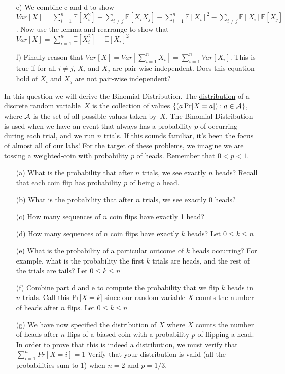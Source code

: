 \documentclass[]{article}
\def \exx {\mathbb{E}}
\begin{document}
\begin{qunlist}
\begin{enumerate}
\qpart
\item[e)] We combine c and d to show $Var[X] = \sum\nolimits_{i=1}^n \exx[X_i^2] + \sum\limits_{i \neq j} \exx[X_iX_j] -  \sum\nolimits_{i=1}^n \exx[X_i]^2 - \sum\limits_{i \neq j} \exx[X_i] \exx[X_j]$. Now use the lemma and rearrange to show that $Var[X] = \sum\nolimits_{i=1}^n \exx[X_i^2] - \exx[X_i]^2$
\qpart
\item[f)] Finally reason that $Var[X] = Var[\sum\nolimits_{i=1}^n X_i] =    \sum\nolimits_{i=1}^n Var[X_i]$. This is true if for all $i \neq j$, $X_i$ and $X_j$ are pair-wise independent. Does this equation hold of $X_i$ and $X_j$ are not pair-wise independent?

\end{enumerate}
  
In this question we will derive the Binomial Distribution. The \underline{distribution} of a discrete random variable~$X$ is the collection of values $\{(a \Pr[X=a]):a\in{\cal A}\}$, where ${\cal A}$ is the set of all possible values taken by~$X$. The Binomial Distribution is used when we have an event that always has a probability $p$ of occurring during each trial, and we run $n$ trials. If this sounds familiar, it's been the focus of almost all of our labs! For the target of these problems, we imagine we are tossing a weighted-coin with probability $p$ of heads. Remember that $0 < p < 1$.
\begin{enumerate}
\qpart
\item[(a)] What is the probability that after $n$ trials, we see exactly $n$ heads? Recall that each coin flip has probability $p$ of being a head.
\qpart
\item[(b)] What is the probability that after $n$ trials, we see exactly $0$ heads?
\qpart
\item[(c)] How many sequences of $n$ coin flips have exactly 1 head?
\qpart
\item[(d)] How many sequences of $n$ coin flips have exactly $k$ heads? Let  $0 \leq k \leq n$ 
\qpart
\item[(e)] What is the probability of a particular outcome of $k$ heads occurring? For example, what is the probability the first $k$ trials are heads, and the rest of the trials are tails? Let  $0 \leq k \leq n$ 
\qpart
\item[(f)] Combine part d and e to compute the probability that we flip $k$ heads in $n$ trials. Call this Pr[$X = k$] since our random variable $X$ counts the number of heads after $n$ flips. Let  $0 \leq k \leq n$ 
\qpart
\item[(g)] We have now specified the distribution of $X$ where $X$ counts the number of heads after $n$ flips of a biased coin with a probability $p$ of flipping a head. In order to prove that this is indeed a distribution, we must verify that $\sum\nolimits_{i=1}^n Pr[X=i] = 1$ Verify that your distribution is valid (all the probabilities sum to 1) when $n=2$ and $p=1/3$.

\end{enumerate}
\end{qunlist}
\end{document}
